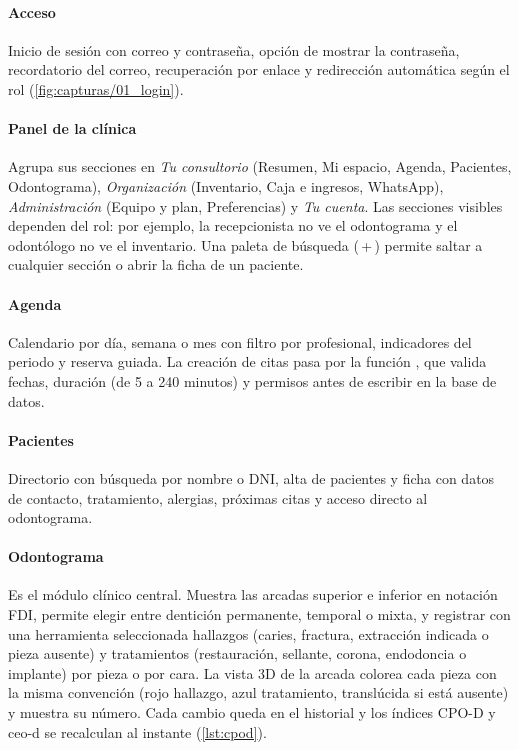 \documentclass[11pt]{article}
\begin{document}

\paragraph{Acceso} Inicio de sesión con correo y contraseña, opción de mostrar la contraseña, recordatorio del correo, recuperación por enlace y redirección automática según el rol (\cref{fig:capturas/01_login}).


\paragraph{Panel de la clínica} Agrupa sus secciones en \emph{Tu consultorio} (Resumen, Mi espacio, Agenda, Pacientes, Odontograma), \emph{Organización} (Inventario, Caja e ingresos, WhatsApp), \emph{Administración} (Equipo y plan, Preferencias) y \emph{Tu cuenta}. Las secciones visibles dependen del rol: por ejemplo, la recepcionista no ve el odontograma y el odontólogo no ve el inventario. Una paleta de búsqueda (\,+\,) permite saltar a cualquier sección o abrir la ficha de un paciente.


\paragraph{Agenda} Calendario por día, semana o mes con filtro por profesional, indicadores del periodo y reserva guiada. La creación de citas pasa por la función , que valida fechas, duración (de 5 a 240 minutos) y permisos antes de escribir en la base de datos.



\paragraph{Pacientes} Directorio con búsqueda por nombre o DNI, alta de pacientes y ficha con datos de contacto, tratamiento, alergias, próximas citas y acceso directo al odontograma.


\paragraph{Odontograma} Es el módulo clínico central. Muestra las arcadas superior e inferior en notación FDI, permite elegir entre dentición permanente, temporal o mixta, y registrar con una herramienta seleccionada hallazgos (caries, fractura, extracción indicada o pieza ausente) y tratamientos (restauración, sellante, corona, endodoncia o implante) por pieza o por cara. La vista 3D de la arcada colorea cada pieza con la misma convención (rojo hallazgo, azul tratamiento, translúcida si está ausente) y muestra su número. Cada cambio queda en el historial y los índices CPO-D y ceo-d se recalculan al instante (\cref{lst:cpod}).
\end{document}
